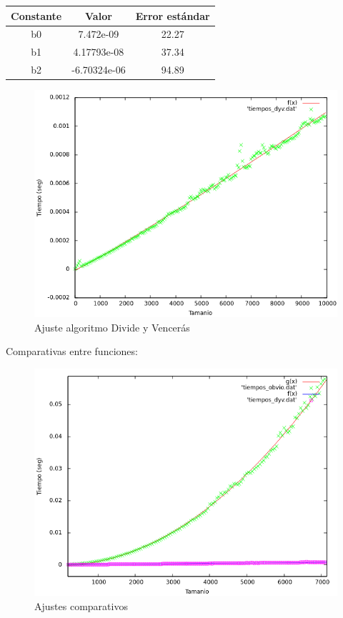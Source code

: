 \documentclass{article}
\begin{document}
	\begin{longtable}{|c|c|c|}
		\hline
		Constante		& Valor			& Error estándar	\\ \hline
		b0              & 7.472e-09		& 22.27	 \\ \hline
		b1              & 4.17793e-08 	& 37.34	 \\ \hline
		b2              & -6.70324e-06	& 94.89	 \\ \hline
	\end{longtable}
	
	\begin{figure}[H]
		\centering
		\includegraphics[totalheight=8cm]{img/DyV_ajustada}
		\caption{Ajuste algoritmo Divide y Vencerás}
		\label{fig:DyV_ajustada}
	\end{figure}
	
	Comparativas entre funciones:
	
	\begin{figure}[H]
		\centering
		\includegraphics[totalheight=8cm]{img/ajustes_total}
		\caption{Ajustes comparativos}
		\label{fig:ajustes_total}
	\end{figure}
\end{document}
